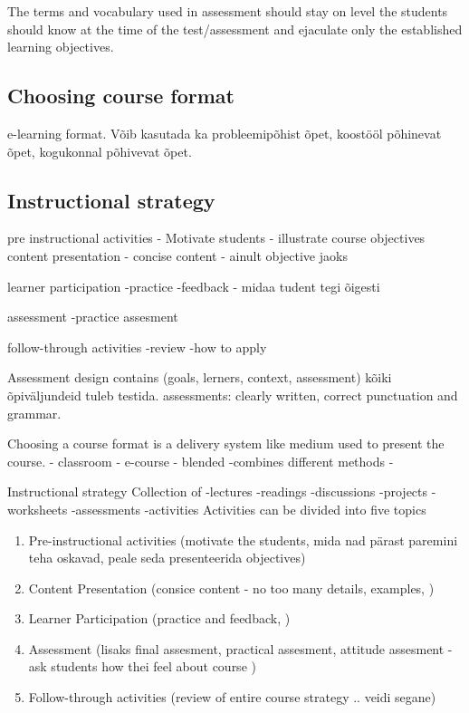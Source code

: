 The terms and vocabulary used in assessment should stay on level the students should know at the time of the test/assessment and ejaculate only the established learning objectives.

\subsection{Choosing course format}

e-learning format. Võib kasutada ka probleemipõhist õpet, koostööl põhinevat õpet, kogukonnal põhivevat õpet.

\subsection{Instructional strategy}


pre instructional activities
- Motivate students
- illustrate course objectives
content presentation
- concise content - ainult objective jaoks


learner participation
-practice
-feedback - midaa tudent tegi õigesti

assessment
-practice assesment

follow-through activities
-review 
-how to apply



Assessment design contains (goals, lerners, context, assessment)
kõiki õpiväljundeid tuleb testida.
assessments: clearly written, correct punctuation and grammar.

Choosing a course format is a delivery system like medium used to present the course.
- classroom
- e-course
- blended -combines different methods
- 

Instructional strategy
Collection of 
-lectures
-readings
-discussions
-projects
-worksheets
-assessments
-activities
Activities can be divided into five topics
\begin{enumerate}
\item Pre-instructional activities (motivate the students, mida nad pärast paremini teha oskavad, peale seda presenteerida objectives)
\item Content Presentation (consice content - no too many details, examples, )
\item Learner Participation (practice and feedback, )
\item Assessment (lisaks final assesment, practical assesment, attitude assesment  - ask students how thei feel about course )
\item Follow-through activities (review of entire course strategy .. veidi segane)
\end{enumerate}




